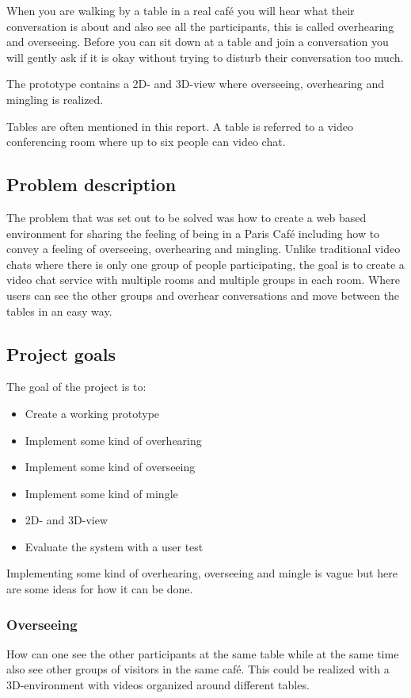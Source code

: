 \documentclass[12pt, titlepage]{article}
\begin{document}
When you are walking by a table in a real café you will hear what their conversation is about and also see all the participants, this is called overhearing and overseeing. Before you can sit down at a table and join a conversation you will gently ask if it is okay without trying to disturb their conversation too much.

The prototype contains a 2D- and 3D-view where overseeing, overhearing and mingling is realized.

Tables are often mentioned in this report. A table is referred to a video conferencing room where up to six people can video chat.
\subsection{Problem description}
The problem that was set out to be solved was how to create a web based environment for sharing the feeling of being in a Paris Café including how to convey a feeling of overseeing, overhearing and mingling. Unlike traditional video chats where there is only one group of people participating, the goal is to create a video chat service with multiple rooms and multiple groups in each room. Where users can see the other groups and overhear conversations and move between the tables in an easy way.
\subsection{Project goals}
The goal of the project is to:
\begin{itemize}
  \item Create a working prototype
  \item Implement some kind of overhearing
  \item Implement some kind of overseeing
  \item Implement some kind of mingle
  \item 2D- and 3D-view
  \item Evaluate the system with a user test
\end{itemize}
Implementing some kind of overhearing, overseeing and mingle is vague but here are some ideas for how it can be done.
\subsubsection{Overseeing}
How can one see the other participants at the same table while at the same time also see other groups of visitors in the same café. This could be realized with a 3D-environment with videos organized around different tables.
\end{document}
